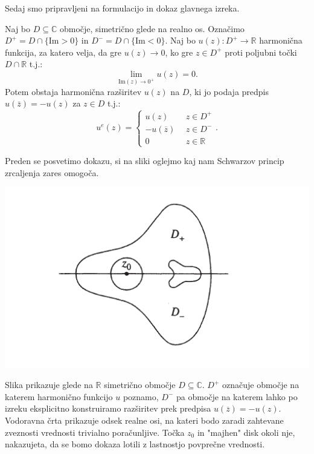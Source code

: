 \documentclass[mat1]{fmfdelo}
\newcommand{\R}{\mathbb R}
\newcommand{\C}{\mathbb C}
\begin{document}
    Sedaj smo pripravljeni na formulacijo in dokaz glavnega izreka.
    \begin{izrek}
        Naj bo $D \subseteq \C$ območje, simetrično glede na realno os. 
        Označimo $D^{+} = D \cap \{\text{Im} > 0\}$ in $D^{-} = D \cap \{\text{Im} < 0\}$.
        \newline
        Naj bo $u(z): D^{+} \to \mathbb{R}$ harmonična funkcija, za katero velja, da gre $u(z) \to 0$, ko gre $z \in D^{+}$ proti poljubni točki $D \cap \mathbb{R}$ t.j.: $$\lim_{\text{Im}(z) \to 0^+} u(z) = 0.$$
        Potem obstaja harmonična razširitev $u(z)$ na $D$, ki jo podaja predpis $u(\bar{z}) = - u(z)$ za $z \in D$ t.j.:
        $$
            u^e(z) = 
            \begin{cases}
                u(z)~~&z \in D^{+}\\
                -u(\overline{z})~~&z \in D^{-}\\
                0~~ &z \in \mathbb{R}
            \end{cases}
            .
        $$
    \end{izrek}
    Preden se posvetimo dokazu, si na sliki oglejmo kaj nam Schwarzov princip zrcaljenja zares omogoča.
    \begin{center}
        \includegraphics[width = 0.8 \textwidth]{schwarzov_princip_zrcaljenja.png}
    \end{center}
    Slika prikazuje glede na $\R$ simetrično območje $D \subseteq \C$. $D^{+}$ označuje območje na katerem harmonično funkcijo $u$ poznamo, $D^{-}$ pa območje na katerem lahko po izreku eksplicitno konstruiramo razširitev prek predpisa $u(\overline{z}) = - u(z)$.
    Vodoravna črta prikazuje odsek realne osi, na kateri bodo zaradi zahtevane zveznosti vrednosti trivialno poračunljive. 
    Točka $z_0$ in "majhen" disk okoli nje, nakazujeta, da se bomo dokaza lotili z lastnostjo povprečne vrednosti.
\end{document}
